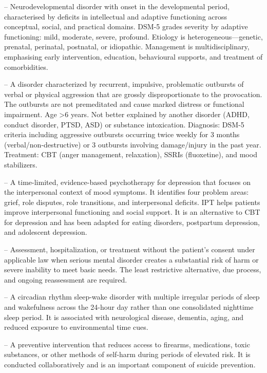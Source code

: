 -- Neurodevelopmental disorder with onset in the developmental period, characterised by deficits in intellectual and adaptive functioning across conceptual, social, and practical domains. DSM-5 grades severity by adaptive functioning: mild, moderate, severe, profound. Etiology is heterogeneous---genetic, prenatal, perinatal, postnatal, or idiopathic. Management is multidisciplinary, emphasising early intervention, education, behavioural supports, and treatment of comorbidities.

-- A disorder characterized by recurrent, impulsive, problematic outbursts of verbal or physical aggression that are grossly disproportionate to the provocation. The outbursts are not premeditated and cause marked distress or functional impairment. Age >6 years. Not better explained by another disorder (ADHD, conduct disorder, PTSD, ASD) or substance intoxication. Diagnosis: DSM-5 criteria including aggressive outbursts occurring twice weekly for 3 months (verbal/non-destructive) or 3 outbursts involving damage/injury in the past year. Treatment: CBT (anger management, relaxation), SSRIs (fluoxetine), and mood stabilizers.

-- A time-limited, evidence-based psychotherapy for depression that focuses on the interpersonal context of mood symptoms. It identifies four problem areas: grief, role disputes, role transitions, and interpersonal deficits. IPT helps patients improve interpersonal functioning and social support. It is an alternative to CBT for depression and has been adapted for eating disorders, postpartum depression, and adolescent depression.


-- Assessment, hospitalization, or treatment without the patient’s consent under applicable law when serious mental disorder creates a substantial risk of harm or severe inability to meet basic needs. The least restrictive alternative, due process, and ongoing reassessment are required.

-- A circadian rhythm sleep-wake disorder with multiple irregular periods of sleep and wakefulness across the 24-hour day rather than one consolidated nighttime sleep period. It is associated with neurological disease, dementia, aging, and reduced exposure to environmental time cues.

-- A preventive intervention that reduces access to firearms, medications, toxic substances, or other methods of self-harm during periods of elevated risk. It is conducted collaboratively and is an important component of suicide prevention.


